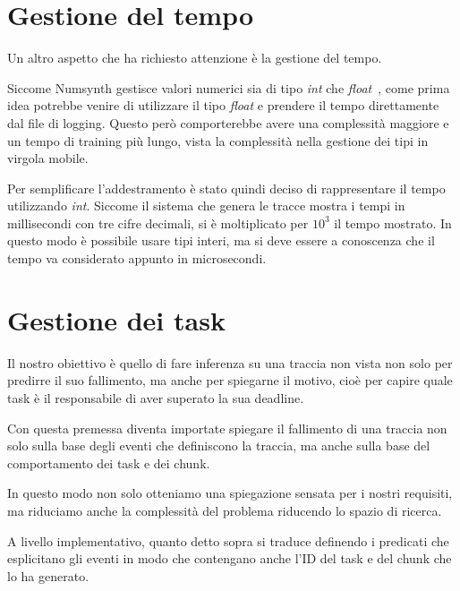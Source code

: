 \section{Gestione del tempo}
Un altro aspetto che ha richiesto attenzione è la gestione del tempo.

Siccome Numsynth gestisce valori numerici sia di tipo \textit{int} che \textit{float}~\cite{numsynth}, come prima idea potrebbe venire di utilizzare il tipo \textit{float} e prendere il tempo direttamente dal file di logging. Questo però comporterebbe avere una complessità maggiore e un tempo di training più lungo, vista la complessità nella gestione dei tipi in virgola mobile.

\myskip

Per semplificare l'addestramento è stato quindi deciso di rappresentare il tempo utilizzando \textit{int}. Siccome il sistema che genera le tracce mostra i tempi in millisecondi con tre cifre decimali, si è moltiplicato per $10^3$ il tempo mostrato. In questo modo è possibile usare tipi interi, ma si deve essere a conoscenza che il tempo va considerato appunto in microsecondi.

\section{Gestione dei task}
\label{sec:gestione-task}
Il nostro obiettivo è quello di fare inferenza su una traccia non vista non solo per predirre il suo fallimento, ma anche per spiegarne il motivo, cioè per capire quale task è il responsabile di aver superato la sua deadline.

Con questa premessa diventa importate spiegare il fallimento di una traccia non solo sulla base degli eventi che definiscono la traccia, ma anche sulla base del comportamento dei task e dei chunk.

In questo modo non solo otteniamo una spiegazione sensata per i nostri requisiti, ma riduciamo anche la complessità del problema riducendo lo spazio di ricerca.

\myskip

A livello implementativo, quanto detto sopra si traduce definendo i predicati che esplicitano gli eventi in modo che contengano anche l'ID del task e del chunk che lo ha generato.
